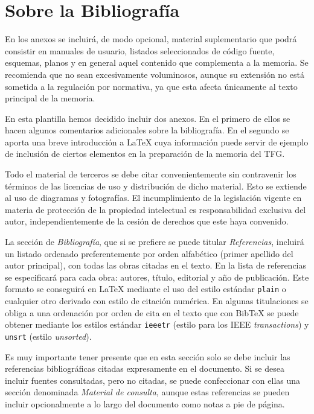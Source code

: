 \chapter{Sobre la Bibliografía}
\label{cap:AnexoA}

En los anexos se incluirá, de modo opcional, material suplementario que podrá consistir en manuales de usuario, listados seleccionados de código fuente, esquemas, planos y en general aquel contenido que complementa a la memoria. Se recomienda que no sean excesivamente voluminosos, aunque su extensión no está sometida a la regulación por normativa, ya que esta afecta únicamente al texto principal de la memoria.

En esta plantilla hemos decidido incluir dos anexos. En el primero de ellos se hacen algunos comentarios adicionales sobre la bibliografía. En el segundo se aporta una breve introducción a \LaTeX{} cuya información puede servir de ejemplo de inclusión de ciertos elementos en la preparación de la memoria del TFG.

Todo el material de terceros se debe citar convenientemente sin contravenir los términos de las licencias de uso y distribución de dicho material. Esto se extiende al uso de diagramas y fotografías. El incumplimiento de la legislación vigente en materia de protección de la propiedad intelectual es responsabilidad exclusiva del autor, independientemente de la cesión de derechos que este haya convenido.

La sección de \emph{Bibliografía}, que si se prefiere se puede titular \emph{Referencias}, incluirá un listado ordenado preferentemente por orden alfabético (primer apellido del autor principal), con todas las obras citadas en el texto. En la lista de referencias se especificará para cada obra: autores, título, editorial y año de publicación. Este formato se conseguirá en \LaTeX{} mediante el uso del estilo estándar \texttt{plain} o cualquier otro derivado con estilo de citación numérica. En algunas titulaciones se obliga a una ordenación por orden de cita en el texto que con Bib\TeX{} se puede obtener mediante los estilos estándar \texttt{ieeetr} (estilo para los IEEE \emph{transactions}) y \texttt{unsrt} (estilo \emph{unsorted}). 

Es muy importante tener presente que en esta sección solo se debe incluir las referencias bibliográficas citadas expresamente en el documento. Si se desea incluir fuentes consultadas, pero no citadas, se puede confeccionar con ellas una sección denominada \emph{Material de consulta}, aunque estas referencias se pueden incluir opcionalmente a lo largo del documento como notas a pie de página.

